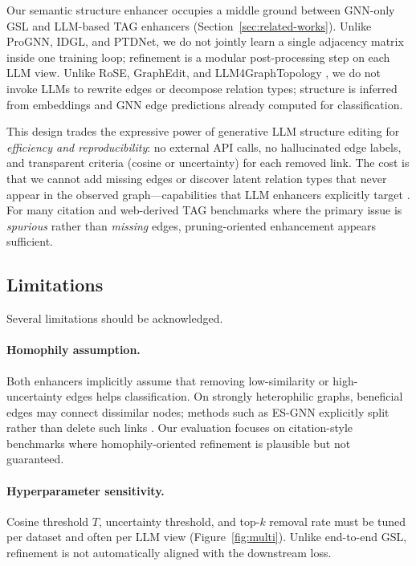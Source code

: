 Our semantic structure enhancer occupies a middle ground between GNN-only GSL and
LLM-based TAG enhancers (Section~\ref{sec:related-works}). Unlike ProGNN, IDGL, and
PTDNet, we do not jointly learn a single adjacency matrix inside one training loop;
refinement is a modular post-processing step on each LLM view. Unlike RoSE, GraphEdit, and
LLM4GraphTopology \citep{Sun2026TopologicalEnhancerTAG,guo2024graphedit}, we do not
invoke LLMs to rewrite edges or decompose relation types; structure is inferred from
embeddings and GNN edge predictions already computed for classification.

This design trades the expressive power of generative LLM structure editing for
\emph{efficiency and reproducibility}: no external API calls, no hallucinated edge
labels, and transparent criteria (cosine or uncertainty) for each removed link. The cost
is that we cannot add missing edges or discover latent relation types that never appear
in the observed graph---capabilities that LLM enhancers explicitly target
\citep{Sun2026TopologicalEnhancerTAG,Yu2025NodeGenerationTAG}. For many citation and
web-derived TAG benchmarks where the primary issue is \emph{spurious} rather than
\emph{missing} edges, pruning-oriented enhancement appears sufficient.


\subsection{Limitations}
\label{sec:disc-limitations}

Several limitations should be acknowledged.

\paragraph{Homophily assumption.}
Both enhancers implicitly assume that removing low-similarity or high-uncertainty edges
helps classification. On strongly heterophilic graphs, beneficial edges may connect
dissimilar nodes; methods such as ES-GNN explicitly split rather than delete such
links \citep{li2024esgnn}. Our evaluation focuses on citation-style benchmarks where
homophily-oriented refinement is plausible but not guaranteed.

\paragraph{Hyperparameter sensitivity.}
Cosine threshold $T$, uncertainty threshold, and top-$k$ removal rate must be tuned
per dataset and often per LLM view (Figure~\ref{fig:multi}). Unlike end-to-end GSL,
refinement is not automatically aligned with the downstream loss.

